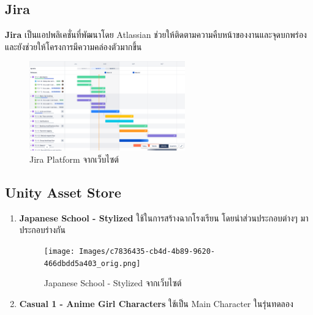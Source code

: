 \subsection{Jira}
\subsubitem \textbf{Jira} \cite{jira:program} เป็นแอปพลิเคชั่นที่พัฒนาโดย Atlassian ช่วยให้ติดตามความคืบหน้าของงานและจุดบกพร่อง และยังช่วยให้โครงการมีความคล่องตัวมากขึ้น
\begin{figure}[h]
  \centering
  \includegraphics[width=0.6\textwidth, height=0.2\textheight]{Images/screen-roadmaps.png}
  \caption{Jira Platform จากเว็บไซต์}
\end{figure}

\subsection{Unity Asset Store}
\begin{enumerate}
  \item \textbf{Japanese School - Stylized} \cite{japanese-school:asset} ใช้ในการสร้างฉากโรงเรียน โดยนำส่วนประกอบต่างๆ มาประกอบร่างกัน
  \begin{figure}[h]
    \centering
    \texttt{[image: Images/c7836435-cb4d-4b89-9620-466dbdd5a403\_orig.png]}
    \caption{Japanese School - Stylized จากเว็บไซต์}\label{JapaneseSchool}
  \end{figure}
  \item \textbf{Casual 1 - Anime Girl Characters} \cite{anime-girl:asset} ใช้เป็น Main Character ในรุ่นทดลอง
\end{enumerate}


